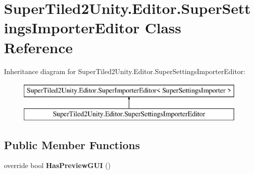 \hypertarget{class_super_tiled2_unity_1_1_editor_1_1_super_settings_importer_editor}{}\section{Super\+Tiled2\+Unity.\+Editor.\+Super\+Settings\+Importer\+Editor Class Reference}
\label{class_super_tiled2_unity_1_1_editor_1_1_super_settings_importer_editor}
Inheritance diagram for Super\+Tiled2\+Unity.\+Editor.\+Super\+Settings\+Importer\+Editor\+:\begin{figure}[H]
\begin{center}
\leavevmode
\includegraphics[height=2.000000cm]{class_super_tiled2_unity_1_1_editor_1_1_super_settings_importer_editor}
\end{center}
\end{figure}
\subsection*{Public Member Functions}
\begin{DoxyCompactItemize}
\item 
\mbox{\label{class_super_tiled2_unity_1_1_editor_1_1_super_settings_importer_editor_a99696253a52e9919e596675b5f662c6e}} 
override bool {\bfseries Has\+Preview\+G\+UI} ()
\end{DoxyCompactItemize}
